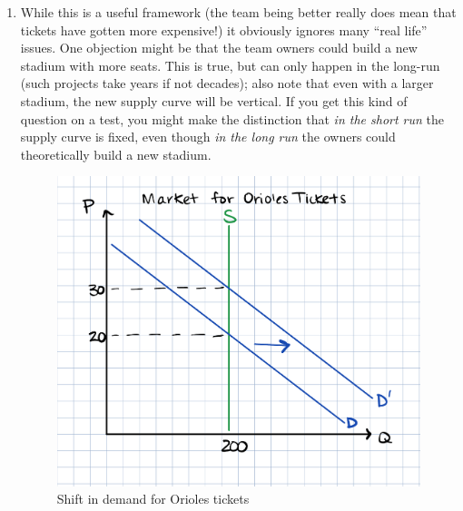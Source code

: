 \documentclass[12pt]{article}
\begin{document}
\begin{enumerate}
\item While this is a useful framework (the team being better really does mean that tickets have gotten more expensive!) it obviously ignores many ``real life'' issues. One objection might be that the team owners could build a new stadium with more seats. This is true, but can only happen in the long-run (such projects take years if not decades); also note that even with a larger stadium, the new supply curve will be vertical. If you get this kind of question on a test, you might make the distinction that \textit{in the short run} the supply curve is fixed, even though \textit{in the long run} the owners could theoretically build a new stadium.

\begin{figure}[H]
    \centering
    \includegraphics[width=.6\textwidth]{orioles_changes.png}
    \caption{Shift in demand for Orioles tickets}
    \label{fig:orioles changes}
\end{figure}

\end{enumerate}
\end{document}

